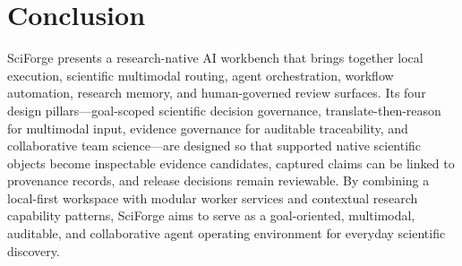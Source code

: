 \documentclass[sn-basic,Numbered,pdflatex]{sn-jnl}
\begin{document}
\section{Conclusion}

SciForge presents a research-native AI workbench that brings together local execution, scientific multimodal routing, agent orchestration, workflow automation, research memory, and human-governed review surfaces. Its four design pillars---goal-scoped scientific decision governance, translate-then-reason for multimodal input, evidence governance for auditable traceability, and collaborative team science---are designed so that supported native scientific objects become inspectable evidence candidates, captured claims can be linked to provenance records, and release decisions remain reviewable. By combining a local-first workspace with modular worker services and contextual research capability patterns, SciForge aims to serve as a goal-oriented, multimodal, auditable, and collaborative agent operating environment for everyday scientific discovery.
\end{document}
